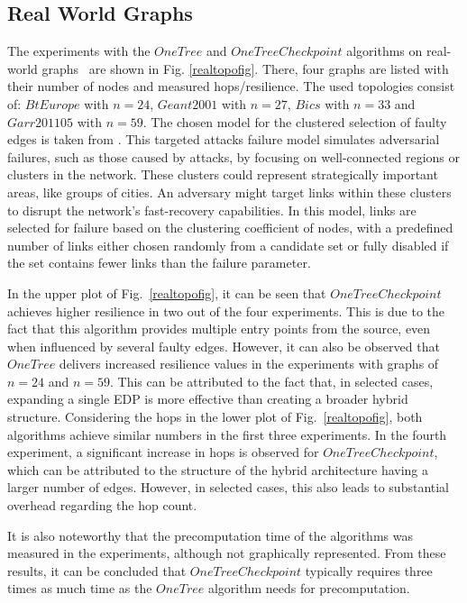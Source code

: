 \documentclass[conference]{IEEEtran}
\begin{document}

\subsection{Real World Graphs}
\label{realEval}
The experiments with the $OneTree$ and $OneTreeCheckpoint$ algorithms on real-world graphs~\cite{topologyZoo} are shown in Fig. \ref{realtopofig}. There, four graphs are listed with their number of nodes and measured hops/resilience. 
The used topologies consist of: $BtEurope$ with $n=24$, $Geant2001$ with $n=27$,  $Bics$ with $n=33$ and $Garr201105$ with $n=59$.
The chosen model for the clustered selection of faulty edges is taken from \cite{clusteredFailures}. 
This targeted attacks failure model simulates adversarial failures, such as those caused by attacks, by focusing on well-connected regions or clusters in the network. 
These clusters could represent strategically important areas, like groups of cities. 
An adversary might target links within these clusters to disrupt the network's fast-recovery capabilities.
In this model, links are selected for failure based on the clustering coefficient of nodes, with a predefined number of links either chosen randomly from a candidate set or fully disabled if the set contains fewer links than the failure parameter.

In the upper plot of Fig.~\ref{realtopofig}, it can be seen that $OneTreeCheckpoint$ achieves higher resilience in two out of the four experiments. This is due to the fact that this algorithm provides multiple entry points from the source, even when influenced by several faulty edges.
However, it can also be observed that $OneTree$ delivers increased resilience values in the experiments with graphs of $n=24$ and $n=59$. This can be attributed to the fact that, in selected cases, expanding a single EDP is more effective than creating a broader hybrid structure.
Considering the hops in the lower plot of Fig.~\ref{realtopofig}, both algorithms achieve similar numbers in the first three experiments. 
In the fourth experiment, a significant increase in hops is observed for $OneTreeCheckpoint$, which can be attributed to the structure of the hybrid architecture having a larger number of edges. However, in selected cases, this also leads to substantial overhead regarding the hop count.

It is also noteworthy that the precomputation time of the algorithms was measured in the experiments, although not graphically represented. From these results, it can be concluded that $OneTreeCheckpoint$ typically requires three times as much time as the $OneTree$ algorithm needs for precomputation.
\end{document}
